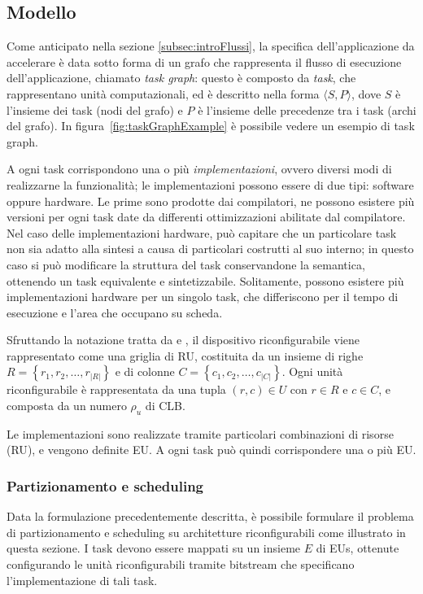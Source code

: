 \subsection{Modello}
\label{subsec:modello}
Come anticipato nella sezione \ref{subsec:introFlussi}, la specifica dell'applicazione
da accelerare è data sotto forma di un grafo che
rappresenta il flusso di esecuzione dell'applicazione, chiamato \emph{task
graph}: questo è composto da \emph{task},
che rappresentano unità computazionali, ed \`e descritto nella forma
$\langle S, P \rangle$, dove $S$ è l'insieme dei task (nodi del grafo) e $P$
\`e l'insieme delle precedenze tra i task (archi del grafo).
In figura~\ref{fig:taskGraphExample} è possibile vedere un esempio di
task graph.

A ogni task corrispondono una o più \emph{implementazioni}, ovvero diversi modi di
realizzarne la funzionalità; le implementazioni possono essere di due tipi: software
oppure hardware. Le prime sono prodotte dai compilatori, ne possono
esistere più versioni per ogni task date da differenti ottimizzazioni abilitate dal
compilatore.
Nel caso delle implementazioni hardware, pu\`o capitare che un particolare task non sia adatto
alla sintesi a causa di particolari costrutti al suo interno; in questo caso si pu\`o modificare
la struttura del task conservandone la semantica, ottenendo un task equivalente e sintetizzabile.
Solitamente, possono esistere più implementazioni hardware per un singolo task,
che differiscono per il tempo di esecuzione e l'area che occupano su scheda.

Sfruttando la notazione tratta da \cite{ModelloRedaelli}
e \cite{ReconfigurableSystemDesignVerification}, il dispositivo riconfigurabile viene 
rappresentato come una griglia di \ac{RU}, costituita da un insieme di righe
$R=\left\{r_1, r_2, \dots, r_{\vert R \vert}\right\}$ e 
di colonne $C=\left\{c_1, c_2, \dots, c_{\vert C \vert}\right\}$. Ogni unità 
riconfigurabile è rappresentata da una tupla $(r,c) \in U$ con $r \in R$ e $c \in C$, e 
composta da un numero $\rho_{u}$ di \ac{CLB}.

Le implementazioni sono realizzate tramite particolari combinazioni di risorse (\ac{RU}),
e vengono definite \ac{EU}. A ogni task può quindi corrispondere una o più \ac{EU}.

\subsubsection{Partizionamento e scheduling}
Data la formulazione precedentemente descritta, è possibile formulare il problema
di partizionamento e scheduling su architetture riconfigurabili come illustrato in questa
sezione. I task devono essere mappati su un insieme $E$ di \acp{EU}, 
ottenute configurando le unità riconfigurabili tramite bitstream che specificano 
l'implementazione di tali task.

